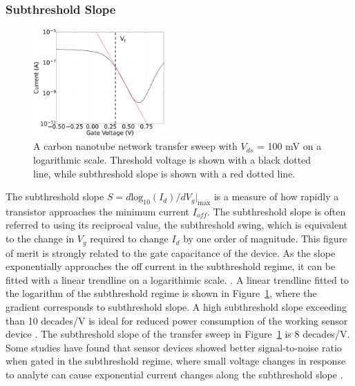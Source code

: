 \documentclass[
  a4paper,
]{scrbook}
\begin{document}
\hypertarget{subthreshold-slope}{%
\subsubsection*{Subthreshold Slope}\label{subthreshold-slope}}

\begin{figure}

{\centering \includegraphics[width=0.45\textwidth,height=\textheight]{figures/ch2/NTQ31C5ch1subthreshold_slope_alt.png}

}

\caption{\label{fig-subthreshold-slope}A carbon nanotube network
transfer sweep with \(V_{ds}\) = 100 mV on a logarithmic scale.
Threshold voltage is shown with a black dotted line, while subthreshold
slope is shown with a red dotted line.}

\end{figure}

The subthreshold slope
\(S = d\textrm{log}_{10}(I_{d})/dV_g|_{\textrm{max}}\) is a measure of
how rapidly a transistor approaches the minimum current \(I_{off}\). The
subthreshold slope is often referred to using its reciprocal value, the
subthreshold swing, which is equivalent to the change in \(V_g\)
required to change \(I_d\) by one order of magnitude. This figure of
merit is strongly related to the gate capacitance of the device. As the
slope exponentially approaches the off current in the subthreshold
regime, it can be fitted with a linear trendline on a logarithimic
scale. \autocite{Sze2006,Petti2016}. A linear trendline fitted to the
logarithm of the subthreshold regime is shown in
Figure~\ref{fig-subthreshold-slope}, where the gradient corresponds to
subthreshold slope. A high subthreshold slope exceeding than 10
decades/V is ideal for reduced power consumption of the working sensor
device \autocite{Petti2016}. The subthreshold slope of the transfer
sweep in Figure~\ref{fig-subthreshold-slope} is 8 decades/V. Some
studies have found that sensor devices showed better signal-to-noise
ratio when gated in the subthreshold regime, where small voltage changes
in response to analyte can cause exponential current changes along the
subthreshold slope \autocite{Heller2009,Gao2010}.
\end{document}
